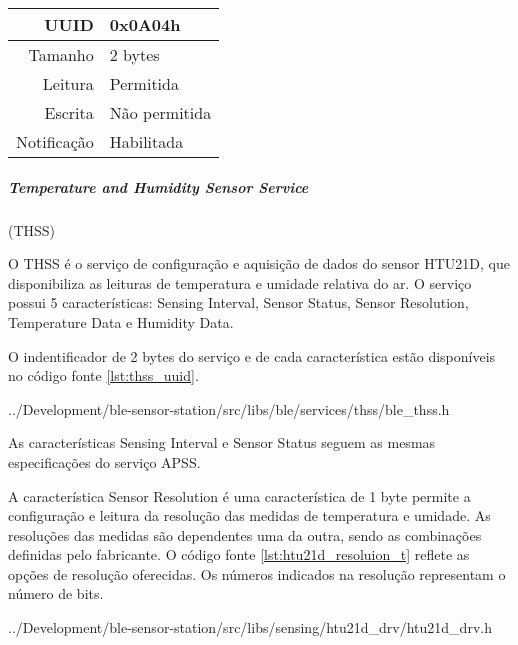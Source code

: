 \begin{tcolorbox}[arc=3mm,fontupper=\small,fonttitle=\bfseries,
subtitle style={boxrule=0.4pt, colback=white},colframe=green!25!black,
halign=center,bottom=0mm,
title=Air Pressure Sensor Service]
\begin{tcbitemize}[raster columns=2,raster equal height,fontupper=\footnotesize,
	colbacktitle=yellow!100!red!100!black, coltitle=black,
	fonttitle=\footnotesize\bfseries,size=small, halign=center]
		\tcbitem [squeezed title={Temperature Data Characteristic}]
		\begin{tabular}{ r | l }
		UUID & 0x0A04h \\ \hline
		Tamanho & 2 bytes \\ \hline
		Leitura & Permitida \\ \hline
		Escrita & Não permitida \\ \hline
		Notificação & Habilitada 
		\end{tabular}		
	\end{tcbitemize}
	\tcblower
	\label{fig:resumo_apss}
\end{tcolorbox}

\newpage
\subparagraph{Temperature and Humidity Sensor Service}(THSS) 
\newline

O THSS é o serviço de configuração e aquisição de dados do sensor HTU21D, que
disponibiliza as leituras de temperatura e umidade relativa do ar. O serviço
possui 5 características: Sensing Interval, Sensor Status, Sensor Resolution,
Temperature Data e Humidity Data.

O indentificador de 2 bytes do serviço e de cada característica estão
disponíveis no código fonte \ref{lst:thss_uuid}.

\begin{minipage}{0.95\linewidth}

{../Development/ble-sensor-station/src/libs/ble/services/thss/ble_thss.h}
\end{minipage}

As características Sensing Interval e Sensor Status seguem as mesmas
especificações do serviço APSS.

A característica Sensor Resolution é uma característica de 1 byte permite a
configuração e leitura da resolução das medidas de temperatura e umidade. As
resoluções das medidas são dependentes uma da outra, sendo as combinações
definidas pelo fabricante. O código fonte \ref{lst:htu21d_resoluion_t} reflete
as opções de resolução oferecidas. Os números indicados na resolução
representam o número de bits.

\begin{minipage}{0.95\linewidth}

{../Development/ble-sensor-station/src/libs/sensing/htu21d_drv/htu21d_drv.h}
\end{minipage}

